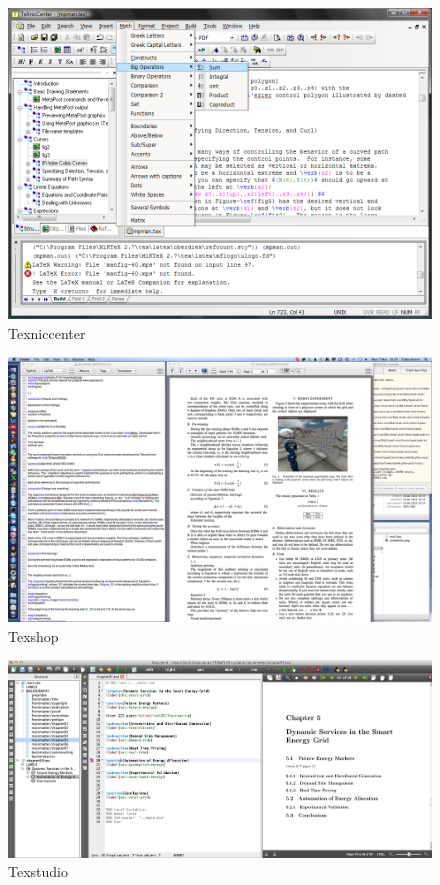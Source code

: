 \begin{figure}
\includegraphics[width=\textwidth]{texniccenter.png}
\caption{Texniccenter}
\label{fig:latex:texniccenter} 
\end{figure}


\begin{figure}
\includegraphics[width=\textwidth]{texshop.png}
\caption{Texshop}
\label{fig:latex:texshop} 
\end{figure}

\begin{figure}
\includegraphics[width=\textwidth]{texstudio.jpg}
\caption{Texstudio}
\label{fig:latex:texstudio} 
\end{figure}


